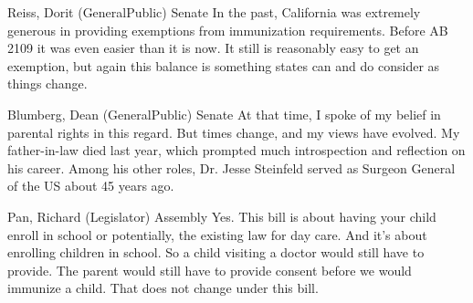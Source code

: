 \begin{result}{7.46386998412798}{Reiss, Dorit (GeneralPublic) Senate}
In the past, California was extremely generous in providing exemptions from immunization requirements. Before AB 2109 it was even easier than it is now. It still is reasonably easy to get an exemption, but again this balance is something states can and do consider as things change.
\end{result}

\begin{result}{7.024375537439714}{Blumberg, Dean (GeneralPublic) Senate}
At that time, I spoke of my belief in parental rights in this regard. But times change, and my views have evolved. My father-in-law died last year, which prompted much introspection and reflection on his career. Among his other roles, Dr. Jesse Steinfeld served as Surgeon General of the US about 45 years ago.
\end{result}

\begin{result}{7.022988478253524}{Pan, Richard (Legislator) Assembly}
Yes. This bill is about having your child enroll in school or potentially, the existing law for day care. And it's about enrolling children in school. So a child visiting a doctor would still have to provide. The parent would still have to provide consent before we would immunize a child. That does not change under this bill.
\end{result}


